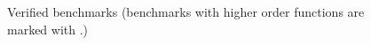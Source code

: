 \begin{figure}[t]
  \caption{Verified benchmarks (benchmarks with higher order functions are
    marked with \hobenchmark.)}
  \label{fig-experiments}
\end{figure}

